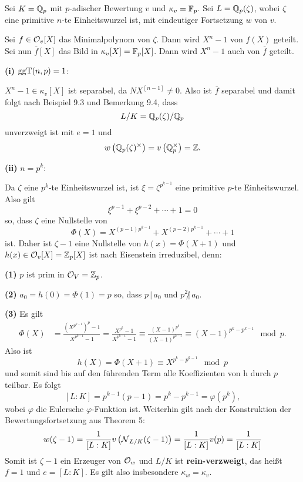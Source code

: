 \begin{Bsp}
	Sei $K=\mathbb{Q}_p$ mit $p$-adischer Bewertung $v$ und $\kappa_v = \mathbb{F}_p$.
	Sei $L=\mathbb{Q}_p(\zeta)$, wobei $\zeta$ eine primitive $n$-te Einheitswurzel ist, mit eindeutiger Fortsetzung $w$ von $v$.
	
	\bigskip
	Sei $f\in\mathcal{O}_v[X]$ das Minimalpolynom von $\zeta$. Dann wird $X^n-1$ von $f(X)$ geteilt.
	Sei nun $\overline{f}[X]$ das Bild in $\kappa_v[X] = \mathbb{F}_p[X]$. Dann wird $X^n-1$ auch von $\overline{f}$ geteilt.
	
	\bigskip
	\textbf{(i)} $\operatorname{ggT}(n,p) = 1$:
	
	$X^n-1 \in \kappa_v[X]$ ist separabel, da $NX^[n-1] \neq 0$.
	Also ist $\overline{f}$ separabel und damit folgt nach Beispiel 9.3 und Bemerkung 9.4, dass
	\[ L/ K = \mathbb{Q}_p(\zeta) / \mathbb{Q}_p
	\]
	unverzweigt ist mit $e=1$ und
	\[w \left( \mathbb{Q}_p(\zeta)^\times \right)
	=v\left(\mathbb{Q}_p^\times \right)
	=\mathbb{Z}.
	\]
	
	\bigskip \textbf{(ii)} $n=p^k$:
	
	Da $\zeta$ eine $p^k$-te Einheitswurzel ist, ist $\xi = \zeta^{p^{k-1}}$ eine primitive $p$-te Einheitswurzel. Also gilt
	\[ \xi^{p-1} + \xi^{p-2} + \cdots + 1 = 0
	\]
	so, dass $\zeta$ eine Nullstelle von
	\[ \Phi(X) = X^{(p-1)p^{k-1}} + X^{(p-2)p^{k-1}} + \cdots +1
	\]
	ist. Daher ist $\zeta-1$ eine Nullstelle von $h(x) = \Phi(X+1)$ und $h(x) \in \mathcal{O}_v[X] = \mathbb{Z}_p[X]$ ist nach Eisenstein irreduzibel, denn:
	
	\textbf{(1)} $p$ ist prim in $\mathcal{O}_V = \mathbb{Z}_p$.
	
	\textbf{(2)} $a_0 = h(0) = \Phi(1) = p$ so, dass $p \, | \, a_0$ und $p^2 \not | \,a_0$.
	
	\textbf{(3)} Es gilt
	\begin{align*}
	\Phi(X)
	&= \frac{ \left( X^{p^{k-1}} \right)^p - 1  }{ X^{p^{k-1}} - 1 }
	=\frac{{ X^{p^{k}} - 1 }}{{ X^{p^{k-1}} - 1 }}
	\equiv \frac{{ (X-1)^{p^{k}}}}{{ (X-1)^{p^{k-1}}}}
	\equiv (X-1)^{p^k-p^{k-1}}
	\mod p.
	\end{align*}
	Also ist
	\[ h(X) = \Phi(X+1) \equiv X^{p^k-p^{k-1}} \mod p
	\]
	und somit sind bis auf den führenden Term alle Koeffizienten von h durch $p$ teilbar.
	Es folgt
	\[ [L:K] = p^{k-1}(p-1) = p^k - p^{k-1} = \varphi \left(p^k \right),
	\]
	wobei $\varphi$ die Eulersche $\varphi$-Funktion ist.
	Weiterhin gilt nach der Konstruktion der Bewertungsfortsetzung aus Theorem 5:
	\[ w(\zeta-1)
	= \frac{1}{[L:K]} v \left( \operatorname{\mathcal{N}}_{L/K} ( \zeta-1) \right)
	= \frac{1}{[L:K]} v(p)
	= \frac{1}{[L:K]}
	\]
	Somit ist $\zeta -1$ ein Erzeuger von $\mathcal{O}_w$ und $L/K$ ist \textbf{rein-verzweigt}, das heißt $f=1$ und $e=[L:K]$. Es gilt also insbesondere $\kappa_w = \kappa_v$.
\end{Bsp}


